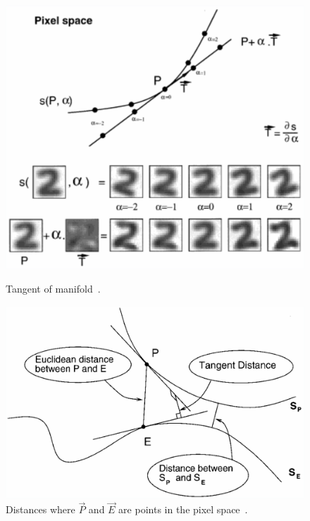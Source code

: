 \begin{figure}[H]
    \centering
    \begin{minipage}{.45\textwidth}
        \includegraphics[width = \linewidth]{images/knn/manifold_tangent.png}
        \caption{Tangent of manifold~\cite{Simard2000}.}\label{fig:manifold_tangent}
    \end{minipage}\hspace{1em}
    \begin{minipage}{.45\textwidth}
        \includegraphics[width = \linewidth]{images/knn/manifold_distance.png}
        \caption{Distances where \(\vec{P}\) and \(\vec{E}\) are points in the pixel space~\cite{Simard2000}.}\label{fig:manifold_distance}
    \end{minipage}
\end{figure}


